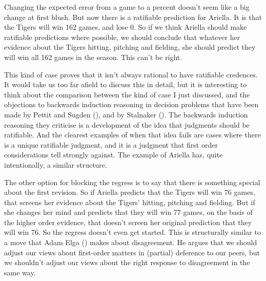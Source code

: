 \documentclass[
  10pt,
  letterpaper,
  twoside]{scrbook}
\begin{document}
Changing the expected error from a game to a percent doesn't seem like a
big change at first blush. But now there is a ratifiable prediction for
{Ariella}. It is that the Tigers will win 162 games, and lose 0. So if
we think {Ariella} should make ratifiable predictions where possible, we
should conclude that whatever her evidence about the Tigers hitting,
pitching and fielding, she should predict they will win all 162 games in
the season. This can't be right.

This kind of case proves that it isn't always rational to have
ratifiable credences. It would take us too far afield to discuss this in
detail, but it is interesting to think about the comparison between the
kind of case I just discussed, and the objections to backwards induction
reasoning in decision problems that have been made by Pettit and Sugden
(), and by Stalnaker
(). The backwards induction reasoning
they criticise is a development of the idea that judgments should be
ratifiable. And the clearest examples of when that idea fails are cases
where there is a unique ratifiable judgment, and it is a judgment that
first order considerations tell strongly against. The example of
{Ariella} has, quite intentionally, a similar structure.

The other option for blocking the regress is to say that there is
something special about the first revision. So if {Ariella} predicts
that the Tigers will win 76 games, that screens her evidence about the
Tigers' hitting, pitching and fielding. But if she changes her mind and
predicts that they will win 77 games, on the basis of the higher order
evidence, that doesn't screen her original prediction that they will win
76. So the regress doesn't even get started. This is structurally
similar to a move that Adam Elga () makes
about disagreement. He argues that we should adjust our views about
first-order matters in (partial) deference to our peers, but we
shouldn't adjust our views about the right response to disagreement in
the same way.
\end{document}
